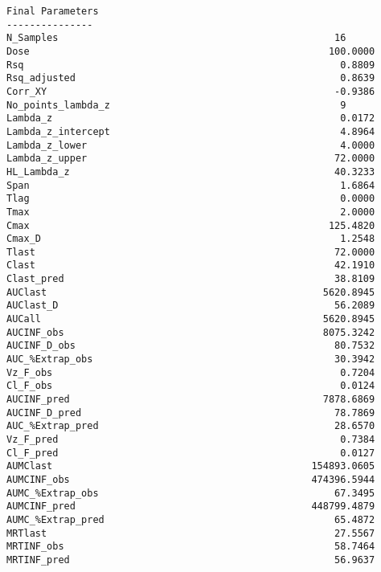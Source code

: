 \documentclass[12pt,a4paper]{article}
\begin{document}
\begin{verbatim}
Final Parameters
---------------
N_Samples                                                16
Dose                                                    100.0000
Rsq                                                       0.8809
Rsq_adjusted                                              0.8639
Corr_XY                                                  -0.9386
No_points_lambda_z                                        9
Lambda_z                                                  0.0172
Lambda_z_intercept                                        4.8964
Lambda_z_lower                                            4.0000
Lambda_z_upper                                           72.0000
HL_Lambda_z                                              40.3233
Span                                                      1.6864
Tlag                                                      0.0000
Tmax                                                      2.0000
Cmax                                                    125.4820
Cmax_D                                                    1.2548
Tlast                                                    72.0000
Clast                                                    42.1910
Clast_pred                                               38.8109
AUClast                                                5620.8945
AUClast_D                                                56.2089
AUCall                                                 5620.8945
AUCINF_obs                                             8075.3242
AUCINF_D_obs                                             80.7532
AUC_%Extrap_obs                                          30.3942
Vz_F_obs                                                  0.7204
Cl_F_obs                                                  0.0124
AUCINF_pred                                            7878.6869
AUCINF_D_pred                                            78.7869
AUC_%Extrap_pred                                         28.6570
Vz_F_pred                                                 0.7384
Cl_F_pred                                                 0.0127
AUMClast                                             154893.0605
AUMCINF_obs                                          474396.5944
AUMC_%Extrap_obs                                         67.3495
AUMCINF_pred                                         448799.4879
AUMC_%Extrap_pred                                        65.4872
MRTlast                                                  27.5567
MRTINF_obs                                               58.7464
MRTINF_pred                                              56.9637
\end{verbatim}
\end{document}
